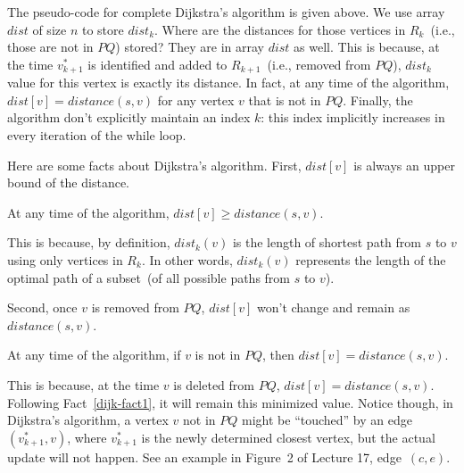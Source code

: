 \begin{minipage}{0.8\textwidth}
	\xxx
	\xxx
	\xxx
	\xxx
	\xxx
	\xxx
	\xxx
	\xxx
	\xxx
	\xxx
	\xxx
	\xxx
	\xxx
	\xxx
	\xxx
	\xxx
	\xxx
\end{minipage}

The pseudo-code for complete Dijkstra's algorithm is given above.
We use array $dist$ of size $n$ to store $dist_k$.
Where are the distances for those vertices in $R_k$~(i.e., those are not in $PQ$) stored?
They are in array $dist$ as well.
This is because, at the time $v_{k+1}^*$ is identified and added to $R_{k+1}$~(i.e., removed from $PQ$),
$dist_k$ value for this vertex is exactly its distance.
In fact, at any time of the algorithm, $dist[v] = distance(s,v)$ for any vertex $v$ that is not in $PQ$.
Finally, the algorithm don't explicitly maintain an index $k$: this index implicitly increases in every iteration of the while loop.


Here are some facts about Dijkstra's algorithm.
First, $dist[v]$ is always an upper bound of the distance.
\begin{fact} \label{dijk-fact1}
At any time of the algorithm, $dist[v] \ge distance(s,v)$.
\end{fact}

This is because, by definition, $dist_k(v)$ is the length of 
shortest path from $s$ to $v$ using only vertices in $R_k$.
In other words, $dist_k(v)$ represents the length of the optimal
path of a subset~(of all possible paths from $s$ to $v$).

Second, once $v$ is removed from $PQ$, $dist[v]$ won't change and remain as $distance(s,v)$.
\begin{fact}
At any time of the algorithm, if $v$ is not in $PQ$, then $dist[v] = distance(s,v)$.
\end{fact}
This is because, at the time $v$ is deleted from $PQ$, $dist[v] = distance(s,v)$.
Following Fact~\ref{dijk-fact1}, it will remain this minimized value.
Notice though, in Dijkstra's algorithm, a vertex $v$ not in $PQ$ might be ``touched''
by an edge $(v^*_{k+1}, v)$, where $v^*_{k+1}$ is the newly determined closest vertex,
   but the actual update will not happen.
See an example in Figure~2 of Lecture 17, edge~$(c, e)$.

